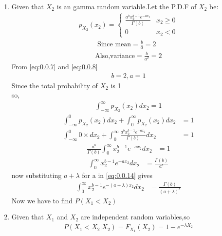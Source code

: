 \documentclass[journal,12pt,twocolumn]{IEEEtran}
\begin{document}
\begin{enumerate}
    \item Given that $X_2$ is an gamma random variable.Let the P.D.F of $X_2$ be:
    \begin{align}
        p_{X_2}(x_2)=
        \begin{cases}
            \frac{a^b x_2^{b-1}e^{-ax_2}}{\Gamma(b)} & x_2\geq 0\\
            0 & x_2<0
        \end{cases}\label{eq:0.0.6}
    \end{align}
    \begin{align}
       \text{ Since mean}=\frac{b}{a}=2\label{eq:0.0.7}\\
         \text{Also,variance}=\frac{b}{a^2}=2\label{eq:0.0.8}
    \end{align}
  From \eqref{eq:0.0.7} and \eqref{eq:0.0.8}
  \begin{align}
      b=2,a=1\label{eq:0.0.9}
  \end{align}
  Since the total probability of $X_2$ is 1 \\
  so,\begin{align}
      \int_{-\infty}^\infty p_{X_2}(x_2) dx_2=1
      \end{align}
      \begin{align}
      \int_{-\infty} ^0 p_{X_2}(x_2)
     dx_2+\int_{0}^\infty p_{X_2}(x_2) dx_2&=1\\
      \int_{-\infty} ^0 0\times dx_2+\int_{0}^\infty \frac{a^b x_2^{b-1}e^{-ax_2}}{\Gamma(b)} dx_2&=1
      \end{align}
      \begin{align}
      \frac{a^b}{\Gamma(b)} \int_{0}^\infty x_2^{b-1}e^{-ax_2} dx_2&=1
      \end{align}
      \begin{align}
          \int_{0}^\infty x_2^{b-1}e^{-ax_2} dx_2&=\frac{\Gamma(b)}{a^b}\label{eq:0.0.14}
  \end{align}
  now substituting $a+\lambda$ for a in \eqref{eq:0.0.14} gives 
  \begin{align}
      \int_{0}^\infty x_2^{b-1}e^{-(a+\lambda)x_2} dx_2&=\frac{\Gamma(b)}{(a+\lambda)^b}\label{eq:0.0.15}
  \end{align}
  Now we have to find $P(X_1<X_2)$\\
  \item Given that $X_1$ and $X_2$ are independent random variables,so
  \begin{align}
     P(X_1<X_2|X_2)=F_{X_1}(X_2)=1-e^{-\lambda X_2}\label{eq:0.0.16}
  \end{align}

\end{enumerate}
\end{document}

